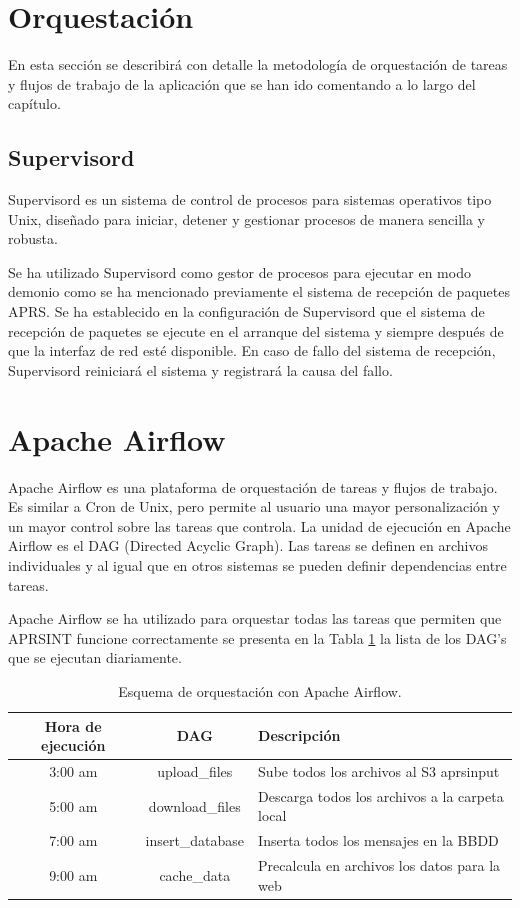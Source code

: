 \section{Orquestación}

En esta sección se describirá con detalle la metodología de orquestación de tareas y flujos de trabajo de la aplicación que se han ido comentando a lo largo del capítulo.

\subsection*{Supervisord}
Supervisord es un sistema de control de procesos para sistemas operativos tipo Unix, diseñado para iniciar, detener y gestionar procesos de manera sencilla y robusta.

Se ha utilizado Supervisord como gestor de procesos para ejecutar en modo demonio como se ha mencionado previamente el sistema de recepción de paquetes APRS. Se ha establecido en la configuración de Supervisord que el sistema de recepción de paquetes se ejecute en el arranque del sistema y siempre después de que la interfaz de red esté disponible. En caso de fallo del sistema de recepción, Supervisord reiniciará el sistema y registrará la causa del fallo.

\section{Apache Airflow}
Apache Airflow es una plataforma de orquestación de tareas y flujos de trabajo. Es similar a Cron de Unix, pero permite al usuario una mayor personalización y un mayor control sobre las tareas que controla. La unidad de ejecución en Apache Airflow es el DAG (Directed Acyclic Graph). Las tareas se definen en archivos individuales y al igual que en otros sistemas se pueden definir dependencias entre tareas.

Apache Airflow se ha utilizado para orquestar todas las tareas que permiten que APRSINT funcione correctamente se presenta en la Tabla \ref{tab:airflow-sched} la lista de los DAG's que se ejecutan diariamente.

\begin{table}[htbp]
	\centering
	\begin{tabular}{|c|c|m{5.5cm}|}
		\hline
		\textbf{Hora de ejecución} & \textbf{DAG} & \textbf{Descripción} \\
		\hline
		3:00 am & upload\_files & Sube todos los archivos al S3 aprsinput \\
		\hline
		5:00 am & download\_files & Descarga todos los archivos a la carpeta local \\
		\hline
		7:00 am  & insert\_database & Inserta todos los mensajes en la BBDD \\
		\hline
		9:00 am & cache\_data & Precalcula en archivos los datos para la web \\
		\hline
	\end{tabular}
	\caption{Esquema de orquestación con Apache Airflow.}
	\label{tab:airflow-sched}
\end{table}

